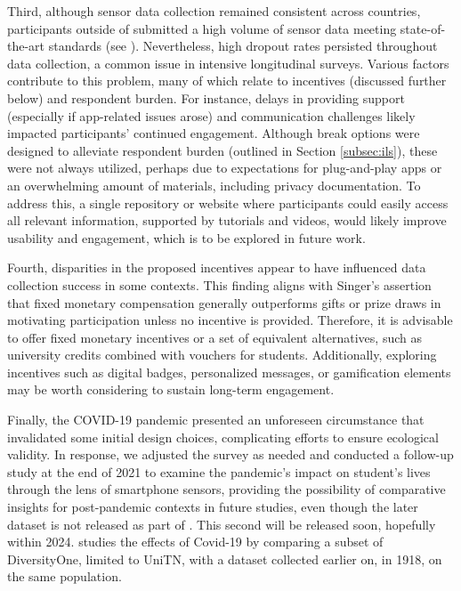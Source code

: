 Third, although sensor data collection remained consistent across countries, participants outside of \AMRITA submitted a high volume of sensor data meeting state-of-the-art standards (see \cite{assi2023complex}). Nevertheless, high dropout rates persisted throughout data collection, a common issue in intensive longitudinal surveys. Various factors contribute to this problem, many of which relate to incentives (discussed further below) and respondent burden. For instance, delays in providing support (especially if app-related issues arose) and communication challenges likely impacted participants’ continued engagement. Although break options were designed to alleviate respondent burden (outlined in Section \ref{subsec:ils}), these were not always utilized, perhaps due to expectations for plug-and-play apps or an overwhelming amount of materials, including privacy documentation. To address this, a single repository or website where participants could easily access all relevant information, supported by tutorials and videos, would likely improve usability and engagement, which is to be explored in future work. 

Fourth, disparities in the proposed incentives appear to have influenced data collection success in some contexts. This finding aligns with Singer’s \cite{singer2013use} assertion that fixed monetary compensation generally outperforms gifts or prize draws in motivating participation unless no incentive is provided. Therefore, it is advisable to offer fixed monetary incentives or a set of equivalent alternatives, such as university credits combined with vouchers for students. Additionally, exploring incentives such as digital badges, personalized messages, or gamification elements may be worth considering to sustain long-term engagement.

Finally, the COVID-19 pandemic presented an unforeseen circumstance that invalidated some initial design choices, complicating efforts to ensure ecological validity. In response, we adjusted the survey as needed and conducted a follow-up study at the end of 2021 to examine the pandemic's impact on student’s lives through the lens of smartphone sensors, providing the possibility of comparative insights for post-pandemic contexts in future studies, even though the later dataset is not released as part of \dataset. This second will be released soon, hopefully within 2024. \cite{girardini2023adaptation} studies the effects of Covid-19 by comparing a subset of DiversityOne, limited to UniTN, with a dataset collected earlier on, in 1918, on the same population.


















